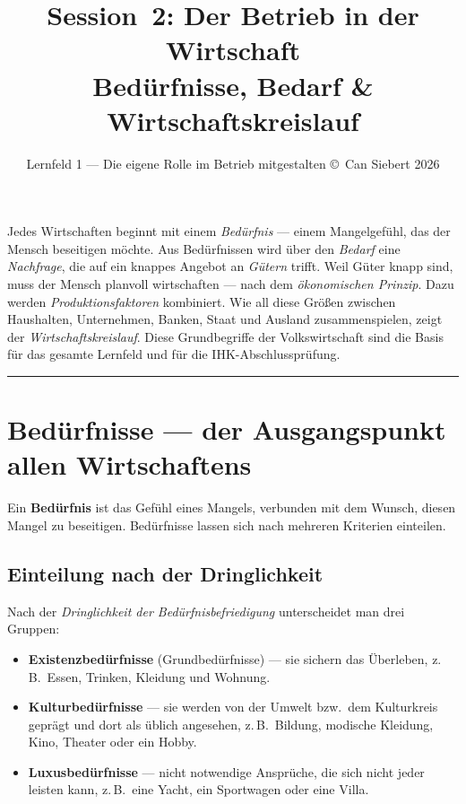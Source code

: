 \documentclass[11pt, a4paper]{article}
\title{\vspace*{-1.5cm}\Huge\bfseries\color{bfwPrimaryDark}Session~2: Der Betrieb in der Wirtschaft\\[0.4em]
  \large\color{bfwInkSoft}\textnormal{Bedürfnisse, Bedarf \& Wirtschaftskreislauf}}
\author{\textsf{Lernfeld 1 --- Die eigene Rolle im Betrieb mitgestalten \textperiodcentered{} \small\copyright\ Can Siebert\,\textperiodcentered\,2026}}
\date{}
\begin{document}
\maketitle
\thispagestyle{empty}

\vspace{1em}
\begin{merksatz}[title={\bfseries Worum geht es in dieser Session?}]
Jedes Wirtschaften beginnt mit einem \emph{Bedürfnis} --- einem Mangelgefühl, das der
Mensch beseitigen möchte. Aus Bedürfnissen wird über den \emph{Bedarf} eine \emph{Nachfrage},
die auf ein knappes Angebot an \emph{Gütern} trifft. Weil Güter knapp sind, muss der Mensch
planvoll wirtschaften --- nach dem \emph{ökonomischen Prinzip}. Dazu werden
\emph{Produktionsfaktoren} kombiniert. Wie all diese Größen zwischen Haushalten,
Unternehmen, Banken, Staat und Ausland zusammenspielen, zeigt der \emph{Wirtschaftskreislauf}.
Diese Grundbegriffe der Volkswirtschaft sind die Basis für das gesamte Lernfeld und
für die IHK-Abschlussprüfung.
\end{merksatz}

\tableofcontents
\vspace{1em}
\hrule
\vspace{1em}

\section{Bedürfnisse --- der Ausgangspunkt allen Wirtschaftens}

Ein \textbf{Bedürfnis} ist das Gefühl eines Mangels, verbunden mit dem Wunsch, diesen
Mangel zu beseitigen. Bedürfnisse lassen sich nach mehreren Kriterien einteilen.

\subsection{Einteilung nach der Dringlichkeit}

Nach der \emph{Dringlichkeit der Bedürfnisbefriedigung} unterscheidet man drei Gruppen:

\begin{itemize}
  \item \textbf{Existenzbedürfnisse} (Grundbedürfnisse) --- sie sichern das Überleben,
    z.\,B.\ Essen, Trinken, Kleidung und Wohnung.
  \item \textbf{Kulturbedürfnisse} --- sie werden von der Umwelt bzw.\ dem Kulturkreis
    geprägt und dort als üblich angesehen, z.\,B.\ Bildung, modische Kleidung, Kino,
    Theater oder ein Hobby.
  \item \textbf{Luxusbedürfnisse} --- nicht notwendige Ansprüche, die sich nicht jeder
    leisten kann, z.\,B.\ eine Yacht, ein Sportwagen oder eine Villa.
\end{itemize}
\end{document}
